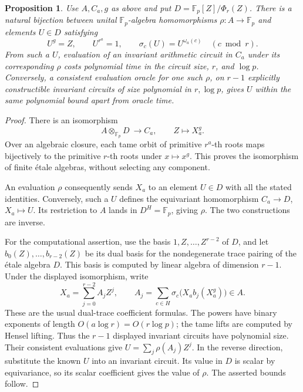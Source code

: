 \documentclass[11pt]{article}
\newtheorem{proposition}[theorem]{Proposition}
\theoremstyle{definition}
\theoremstyle{remark}
\begin{document}
\begin{proposition}\label{prop:succinct-selector-teich-correspondence}
Use \(A,C_a,g\) as above and put
\(D=\mathbb F_p[Z]/\Phi_r(Z)\). There is a natural bijection
between unital \(\mathbb F_p\)-algebra homomorphisms
\(\rho:A\to\mathbb F_p\) and elements \(U\in D\) satisfying
\[
 U^g=Z,\qquad U^{r^a}=1,
 \qquad \sigma_c(U)=U^{\omega_a(c)}\quad(c\bmod r).
\]
From such a \(U\), evaluation of an invariant arithmetic
circuit in \(C_a\) under its corresponding \(\rho\) costs
polynomial time in the circuit size, \(r\), and \(\log p\).
Conversely, a consistent evaluation oracle for one such
\(\rho\), on \(r-1\) explicitly constructible invariant
circuits of size polynomial in \(r,\log p\), gives \(U\)
within the same polynomial bound apart from oracle time.
\end{proposition}
\begin{proof}
There is an isomorphism
\[
                  A\otimes_{\mathbb F_p}D\ \longrightarrow C_a,
                  \qquad Z\longmapsto X_a^g.
\]
Over an algebraic closure, each tame orbit of primitive
\(r^a\)-th roots maps bijectively to the primitive
\(r\)-th roots under \(x\mapsto x^g\). This proves the
isomorphism of finite \'etale algebras, without selecting
any component.

An evaluation \(\rho\) consequently sends \(X_a\) to an
element \(U\in D\) with all the stated identities. Conversely,
such a \(U\) defines the equivariant homomorphism
\(C_a\to D\), \(X_a\mapsto U\). Its restriction to
\(A\) lands in \(D^H=\mathbb F_p\), giving \(\rho\).
The two constructions are inverse.

For the computational assertion, use the basis
\(1,Z,\ldots,Z^{r-2}\) of \(D\), and let
\(b_0(Z),\ldots,b_{r-2}(Z)\) be its dual basis for the
nondegenerate trace pairing of the \'etale algebra \(D\).
This basis is computed by linear algebra of dimension \(r-1\).
Under the displayed isomorphism, write
\[
 X_a=\sum_{j=0}^{r-2}A_jZ^j,
 \qquad
 A_j=\sum_{c\in H}
       \sigma_c\bigl(X_a b_j(X_a^g)\bigr)\in A.
\]
These are the usual dual-trace coefficient formulas.
The powers have binary exponents of length
\(O(a\log r)=O(r\log p)\); the tame lifts are computed
by Hensel lifting. Thus the \(r-1\) displayed invariant
circuits have polynomial size. Their consistent evaluations
give
\(U=\sum_j\rho(A_j)Z^j\).
In the reverse direction, substitute the known \(U\) into
an invariant circuit. Its value in \(D\) is scalar by
equivariance, so its scalar coefficient gives the value of
\(\rho\). The asserted bounds follow.
\end{proof}
\end{document}
